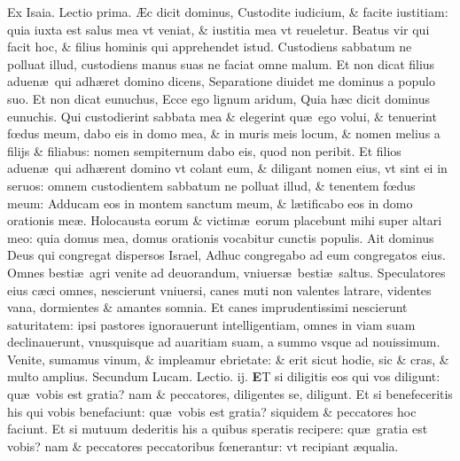 \documentclass[a5paper,10pt]{book}
\def\leftmarginnote{%
	\lrmarginnote{\hskip -\marginparsep \hskip -6.5em}}
\def\rightmarginnote{%
	\lrmarginnote{\hskip\columnwidth \hskip -1em}}
\def\ae{æ}
\def\AE{Æ}
\def\oe{œ}
\begin{document}
\begin{multicols*}{2}
\newline {} \color{red} Ex Isaia. \hfill Lectio prima. \color{black}
\vspace{-1.25em}
\AE c\leftmarginnote{\begin{flushright}c. 56.\end{flushright}} dicit dominus, Custodite iudicium, \& facite iustitiam: quia iuxta est salus mea vt veniat, \& iustitia mea vt reueletur.
Beatus vir qui facit hoc, \& filius hominis qui apprehendet istud.
Custodiens sabbatum ne polluat illud, custodiens manus suas ne faciat omne malum.
Et non dicat filius aduen\ae \ qui adh\ae ret domino dicens, Separatione diuidet me dominus a populo suo.
Et non dicat eunuchus, Ecce ego lignum aridum, Quia h\ae c dicit dominus eunuchis.
Qui custodierint sabbata mea \& elegerint qu\ae \ ego volui, \& tenuerint f\oe dus meum, dabo eis in domo mea, \& in muris meis locum, \& nomen melius a filijs \& filiabus: nomen sempiternum dabo eis, quod non peribit.
Et filios aduen\ae \ qui adh\ae rent domino vt colant eum, \& diligant nomen eius, vt sint ei in seruos: omnem custodientem sabbatum ne polluat illud, \& tenentem f\oe dus meum: Adducam eos in montem sanctum meum, \& l\ae tificabo eos in domo orationis me\ae .
Holocausta eorum \& victim\ae \ eorum placebunt mihi super altari meo: quia domus mea, domus orationis vocabitur cunctis populis.
Ait dominus Deus qui congregat dispersos Israel, Adhuc congregabo ad eum congregatos eius.
Omnes besti\ae \ agri venite ad deuorandum, vniuers\ae \ besti\ae \ saltus.
Speculatores eius c\ae ci omnes, nescierunt vniuersi, canes muti non valentes latrare, videntes vana, dormientes \& amantes somnia.
Et canes imprudentissimi nescierunt saturitatem: ipsi pastores ignorauerunt intelligentiam, omnes in viam suam declinauerunt, vnusquisque ad auaritiam suam, a summo vsque ad nouissimum.
Venite, sumamus vinum, \& impleamur ebrietate: \& erit sicut hodie, sic \& cras, \& multo amplius.
\newline \color{red} Secundum Lucam. \hfill Lectio. ij. \color{black}
\vspace{-.25em}
\lettrine[lines=2]{\bfseries \color{red} E}{}T\rightmarginnote{ca. 6.} si diligitis eos qui vos diligunt: qu\ae \ vobis est gratia? nam \& peccatores, diligentes se, diligunt.
Et si benefeceritis his qui vobis benefaciunt: qu\ae \ vobis est gratia? siquidem \& peccatores hoc faciunt.
Et si mutuum dederitis his a quibus speratis recipere: qu\ae \ gratia est vobis? nam \& peccatores peccatoribus f\oe nerantur: vt recipiant \ae qualia.

\end{multicols*}
\end{document}
